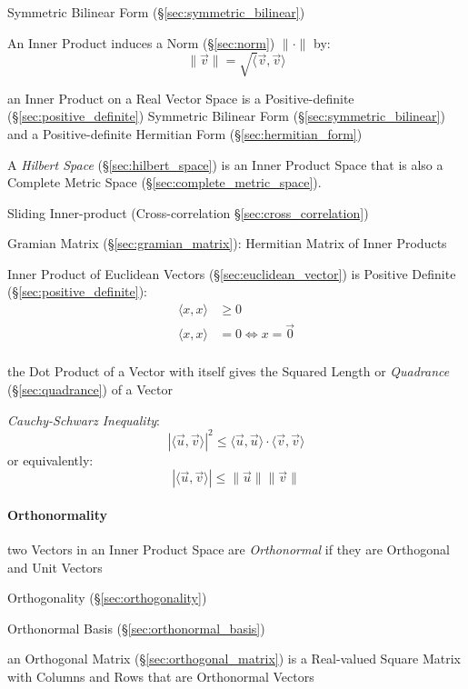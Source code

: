 Symmetric Bilinear Form (\S\ref{sec:symmetric_bilinear})

An Inner Product induces a Norm (\S\ref{sec:norm}) $\|\cdot\|$ by:
\[
  \|\vec{v}\| = \sqrt\langle{\vec{v},\vec{v}}\rangle
\]

an Inner Product on a Real Vector Space is a Positive-definite
(\S\ref{sec:positive_definite}) Symmetric Bilinear Form
(\S\ref{sec:symmetric_bilinear}) and a Positive-definite Hermitian Form
(\S\ref{sec:hermitian_form})

A \emph{Hilbert Space} (\S\ref{sec:hilbert_space}) is an Inner Product Space
that is also a Complete Metric Space (\S\ref{sec:complete_metric_space}).

\fist Sliding Inner-product (Cross-correlation \S\ref{sec:cross_correlation})

\fist Gramian Matrix (\S\ref{sec:gramian_matrix}): Hermitian Matrix of Inner
Products

Inner Product of Euclidean Vectors (\S\ref{sec:euclidean_vector}) is Positive
Definite (\S\ref{sec:positive_definite}):
\begin{align*}
  \langle{x,x}\rangle & \geq 0 \\
  \langle{x,x}\rangle & =    0 \Leftrightarrow x = \vec{0} \\
\end{align*}

the Dot Product of a Vector with itself gives the Squared Length or
\emph{Quadrance} (\S\ref{sec:quadrance}) of a Vector

\emph{Cauchy-Schwarz Inequality}:
\[
  |\langle{\vec{u},\vec{v}}\rangle|^2 \leq
    \langle{\vec{u},\vec{u}}\rangle \cdot \langle{\vec{v},\vec{v}}\rangle
\]
or equivalently:
\[
  |\langle{\vec{u},\vec{v}}\rangle| \leq \|\vec{u}\| \|\vec{v}\|
\]



\paragraph{Orthonormality}\label{sec:orthonormality}\hfill

two Vectors in an Inner Product Space are \emph{Orthonormal} if they are
Orthogonal and Unit Vectors

\fist Orthogonality (\S\ref{sec:orthogonality})

\fist Orthonormal Basis (\S\ref{sec:orthonormal_basis})

an Orthogonal Matrix (\S\ref{sec:orthogonal_matrix}) is a Real-valued Square
Matrix with Columns and Rows that are Orthonormal Vectors




